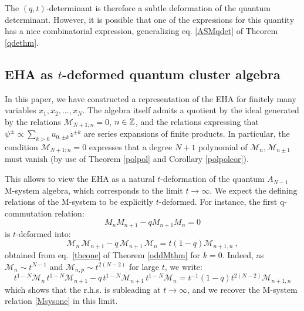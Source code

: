The $(q,t)$-determinant is therefore a subtle deformation of the  quantum determinant. However, it is possible that
one of the expressions for this quantity has a nice combinatorial expression, generalizing eq. \eqref{ASMqdet}
of Theorem \ref{qdethm}.



\subsection{EHA as $t$-deformed quantum cluster algebra}

In this paper, we have constructed a representation of the EHA for finitely many variables $x_1,x_2,...,x_N$.
The algebra itself admits a quotient by the ideal generated by the relations ${\mathcal M}_{N+1;n}=0$, $n\in {\mathbb Z}$,
and the relations expressing that $\psi^{\pm}\propto \sum_{k>0} u_{0,\pm k} z^{\pm k}$ 
are series expansions of finite products. In particular, the condition ${\mathcal M}_{N+1;n}=0$
expresses that a degree $N+1$ polynomial of ${\mathcal M}_n,{\mathcal M}_{n\pm 1}$ 
must vanish (by use of Theorem \ref{polpol} and Corollary \ref{polpolcor}).

This allows to view the EHA as a natural $t$-deformation of the quantum $A_{N-1}$ M-system algebra, 
which corresponds to the limit $t\to\infty$.
We expect the defining relations of the M-system to be explicitly $t$-deformed.
For instance, the first q-commutation relation:
\begin{equation}\label{Msysone}M_nM_{n+1}-qM_{n+1}M_n=0
\end{equation}
is $t$-deformed into:
$$ {\mathcal M}_n \,{\mathcal M}_{n+1}-q\, {\mathcal M}_{n+1}\, {\mathcal M}_n=t(1-q){\mathcal M}_{n+1,n} \ ,$$
obtained from eq.~\eqref{theone} of Theorem \ref{oddMthm} for $k=0$.
Indeed, as ${\mathcal M}_n\sim t^{N-1}$ and ${\mathcal M}_{n,p}\sim t^{2(N-2)}$ for large $t$, we write:
$$ t^{1-N}{\mathcal M}_n \,t^{1-N} {\mathcal M}_{n+1}-q\,t^{1-N} {\mathcal M}_{n+1}\, t^{1-N}{\mathcal M}_n=
t^{-1}(1-q)t^{2(N-2)}{\mathcal M}_{n+1,n} $$
which shows that the r.h.s. is subleading at $t\to \infty$, and we recover the M-system relation \eqref{Msysone} in this limit.


